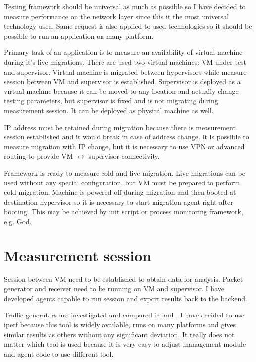 
Testing framework should be universal as much as possible so I have decided to measure performance on the network layer since this it the most universal technology used. Same request is also applied to used technologies so it should be possible to run an application on many platform. 

Primary task of an application is to measure an availability of virtual machine during it's live migrations. There are used two virtual machines: \Ac{VM} under test and supervisor. Virtual machine is migrated between hypervisors while measure session between \Ac{VM} and supervisor is established. Supervisor is deployed as a virtual machine because it can be moved to any location and actually change testing parameters, but supervisor is fixed and is not migrating during measurement session. It can be deployed as physical machine as well.

\Ac{IP} address must be retained during migration because there is measurement session established and it would break in case of address change. It is possible to measure migration with \Ac{IP} change, but it is necessary to use \Ac{VPN} or advanced routing to provide \Ac{VM} $\leftrightarrow$ supervisor connectivity.

Framework is ready to measure cold and live migration. Live migrations can be used without any special configuration, but \Ac{VM} must be prepared to perform cold migration. Machine is powered-off during migration and then booted at destination hypervisor so it is necessary to start migration agent right after booting. This may be achieved by init script or process monitoring framework, e.g. \href{http://godrb.com/}{God}.

\section{Measurement session}
Session between \Ac{VM} need to be established to obtain data for analysis. Packet generator and receiver need to be running on \Ac{VM} and supervisor. I have developed agents capable to run session and export results back to the backend.

Traffic generators are investigated and compared in \cite{traffic-generators1} and \cite{traffic-generators2}. I have decided to use iperf because this tool is widely available, runs on many platforms and gives similar results as others without any significant deviation. It really does not matter which tool is used because it is very easy to adjust management module and agent code to use different tool.

